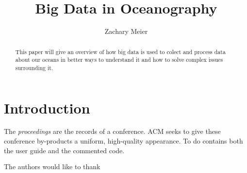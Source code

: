 \documentclass[sigconf]{acmart}
\begin{document}
\title{Big Data in Oceanography}


\author{Zachary Meier}

\renewcommand{\shortauthors}{B. Trovato et al.}


\begin{abstract}
This paper will give an overview of how big data is used to colect and process data about our oceans in better ways to understand it and how to solve complex issues surrounding it. 

\end{abstract}



\maketitle

\section{Introduction}

The \textit{proceedings} are the records of a
conference. ACM seeks to give these
conference by-products a uniform, high-quality appearance.  To do
 contains both the user guide and the commented code.

\begin{acks}

  The authors would like to thank \cite{editor00}

\end{acks}


 


\end{document}
